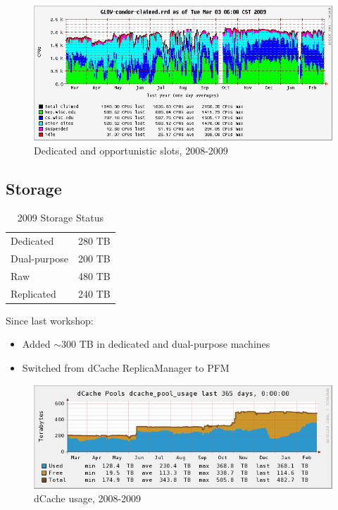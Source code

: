 \documentclass{beamer}
\newcommand{\ca}{\ensuremath{\sim}}
\begin{document}
\begin{frame}
\begin{figure}
    \includegraphics[width=\textwidth]{Graphics/GLOW-condor-claimed-1yr.png}
    \caption{Dedicated and opportunistic slots, 2008-2009}
\end{figure}
\end{frame}

\subsection{Storage}
\begin{frame}
\begin{table}
\begin{tabular}{lr}
    \toprule
    Dedicated       &   280 TB \\   %
    Dual-purpose    &   200 TB \\   %
    \midrule
    Raw             &   480 TB \\
    Replicated      &   240 TB \\
    \bottomrule
\end{tabular}
\caption{2009 Storage Status}
\label{2009_storage_status}
\end{table}

Since last workshop:
\begin{itemize}
    \item Added \ca{}300 TB in dedicated and dual-purpose machines
    \item Switched from dCache ReplicaManager to PFM
\end{itemize}
\end{frame}

\begin{frame}
\begin{figure}
    \includegraphics[width=\textwidth]{Graphics/dcache-usage-1yr.png}
    \caption{dCache usage, 2008-2009}
\end{figure}
\end{frame}
\end{document}
